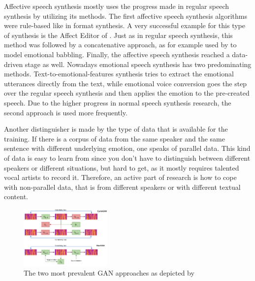 \documentclass[11pt]{article}
\begin{document}
Affective speech synthesis mostly uses the progress made in regular speech synthesis by utilizing its methods. The first affective speech synthesis algorithms were rule-based like in format synthesis. A very successful example for this type of synthesis is the Affect Editor of \cite{cahn_generation_2000}. Just as in regular speech synthesis, this method was followed by a concatenative approach, as for example used by \cite{pierre-yves_production_2003} to model emotional babbling. Finally, the affective speech synthesis reached a data-driven stage as well.
Nowadays emotional speech synthesis has two predominating methods. Text-to-emotional-features synthesis tries to extract the emotional utterances directly from the text, while emotional voice conversion goes the step over the regular speech synthesis and then applies the emotion to the pre-created speech. Due to the higher progress in normal speech synthesis research, the second approach is used more frequently.

Another distinguisher is made by the type of data that is available for the training. If there is a corpus of data from the same speaker and the same sentence with different underlying emotion, one speaks of parallel data. This kind of data is easy to learn from since you don’t have to distinguish between different speakers or different situations, but hard to get, as it mostly requires talented vocal artists to record it. Therefore, an active part of research is how to cope with non-parallel data, that is from different speakers or with different textual content.

\begin{figure}[h]
 \centering
\includegraphics[width=0.4\textwidth]{"Bilder/GAN.PNG"}
\caption{The two most prevalent GAN approaches as depicted by \cite{triantafyllopoulos_overview_2023}}
\end{figure}
\end{document}
